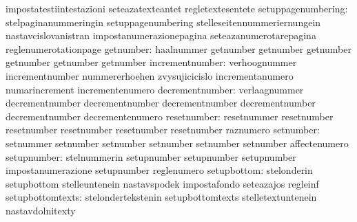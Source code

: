                                   impostatestiintestazioni         seteazatexteantet
                                  regletextesentete
              setuppagenumbering: stelpaginanummeringin            setuppagenumbering
                                  stelleseitennummeriernungein     nastavcislovanistran
                                  impostanumerazionepagina         seteazanumerotarepagina
                                  reglenumerotationpage
                       getnumber: haalnummer                       getnumber
                                  getnumber                        getnumber
                                  getnumber                        getnumber
                                  getnumber
                 incrementnumber: verhoognummer                    incrementnumber
                                  nummererhoehen                   zvysujicicislo
                                  incrementanumero                 numarincrement
                                  incrementenumero
                 decrementnumber: verlaagnummer                    decrementnumber
                                  decrementnumber                  decrementnumber
                                  decrementnumber                  decrementnumber
                                  decrementenumero
                     resetnumber: resetnummer                      resetnumber
                                  resetnumber                      resetnumber
                                  resetnumber                      resetnumber
                                  raznumero
                       setnumber: setnummer                        setnumber
                                  setnumber                        setnumber
                                  setnumber                        setnumber
                                  affectenumero
                     setupnumber: stelnummerin                     setupnumber
                                  setupnumber                      setupnumber
                                  impostanumerazione               setupnumber
                                  reglenumero
                     setupbottom: stelonderin                      setupbottom
                                  stelleuntenein                   nastavspodek
                                  impostafondo                     seteazajos
                                  regleinf
                setupbottomtexts: stelondertekstenin               setupbottomtexts
                                  stelletextuntenein               nastavdolnitexty
